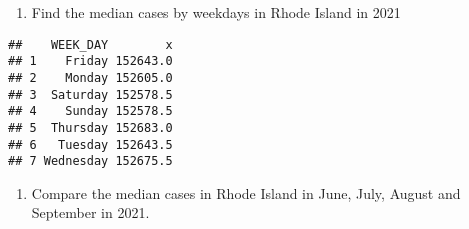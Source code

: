 \documentclass[
]{article}
\newenvironment{Shaded}{\begin{snugshade}}{\end{snugshade}}
\newcommand{\AttributeTok}[1]{\textcolor[rgb]{0.77,0.63,0.00}{#1}}
\newcommand{\DecValTok}[1]{\textcolor[rgb]{0.00,0.00,0.81}{#1}}
\newcommand{\FunctionTok}[1]{\textcolor[rgb]{0.00,0.00,0.00}{#1}}
\newcommand{\NormalTok}[1]{#1}
\newcommand{\OtherTok}[1]{\textcolor[rgb]{0.56,0.35,0.01}{#1}}
\newcommand{\SpecialCharTok}[1]{\textcolor[rgb]{0.00,0.00,0.00}{#1}}
\newcommand{\StringTok}[1]{\textcolor[rgb]{0.31,0.60,0.02}{#1}}
\providecommand{\tightlist}{%
  \setlength{\itemsep}{0pt}\setlength{\parskip}{0pt}}
\begin{document}
\begin{enumerate}
\def\labelenumi{\arabic{enumi}.}
\setcounter{enumi}{13}
\tightlist
\item
  Find the median cases by weekdays in Rhode Island in 2021
\end{enumerate}

\begin{Shaded}
\end{Shaded}

\begin{verbatim}
##    WEEK_DAY        x
## 1    Friday 152643.0
## 2    Monday 152605.0
## 3  Saturday 152578.5
## 4    Sunday 152578.5
## 5  Thursday 152683.0
## 6   Tuesday 152643.5
## 7 Wednesday 152675.5
\end{verbatim}

\begin{enumerate}
\def\labelenumi{\arabic{enumi}.}
\setcounter{enumi}{14}
\tightlist
\item
  Compare the median cases in Rhode Island in June, July, August and
  September in 2021.
\end{enumerate}

\begin{Shaded}
\end{Shaded}
\end{document}
